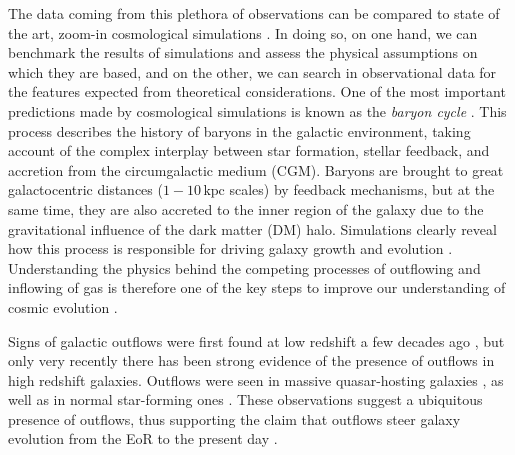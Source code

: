 \documentclass[12pt]{article}
\begin{document}
The data coming from this plethora of observations can be compared to state of the art, zoom-in cosmological simulations \citep{pallottini2017,pallottini2017b, Hopkins18, pallottini:2019}. In doing so, on one hand, we can benchmark the results of simulations and assess the physical assumptions on which they are based, and on the other, we can search in observational data for the features expected from theoretical considerations. One of the most important predictions made by cosmological simulations is known as the \textit{baryon cycle} \citep{peroux2020cosmic}. This process describes the history of baryons in the galactic environment, taking account of the complex interplay between star formation, stellar feedback, and accretion from the circumgalactic medium (CGM). Baryons are brought to great galactocentric distances ($1-10\,\mathrm{kpc}$ scales) by feedback mechanisms, but at the same time, they are also accreted to the inner region of the galaxy due to the gravitational influence of the dark matter (DM) halo. Simulations clearly reveal how this process is responsible for driving galaxy growth and evolution \citep{tumlison}. Understanding the physics behind the competing processes of outflowing and inflowing of gas is therefore one of the key steps to improve our understanding of cosmic evolution \citep{2005ARA&A..43..769V}.

Signs of galactic outflows were first found at low redshift a few decades ago \citep{chevalier_clegg:1985, Walter:2002vq}, but only very recently there has been strong evidence of the presence of outflows in high redshift galaxies. Outflows were seen in massive quasar-hosting galaxies \citep{cicone2015}, as well as in normal star-forming ones \citep{gallerani:2018,Fujimoto19, ginolfi:2019, Sugahara19,Fujimoto:2020qzo, herrera2021kiloparsec}. These observations suggest a ubiquitous presence of outflows, thus supporting the claim that outflows steer galaxy evolution from the EoR to the present day \citep{veilleux2020cool}. 
\end{document}
